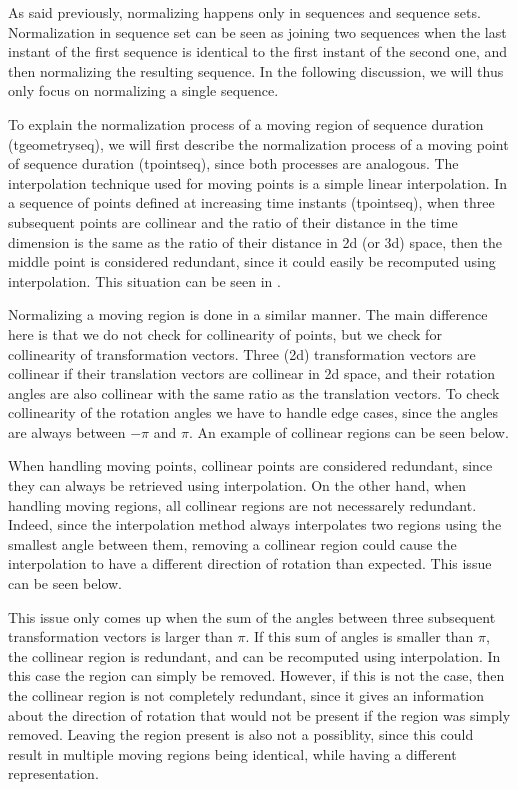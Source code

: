 	As said previously, normalizing happens only in sequences and sequence sets. Normalization in sequence set can be seen as joining two sequences when the last instant of the first sequence is identical to the first instant of the second one, and then normalizing the resulting sequence. In the following discussion, we will thus only focus on normalizing a single sequence.
	
	To explain the normalization process of a moving region of sequence duration (tgeometryseq), we will first describe the normalization process of a moving point of sequence duration (tpointseq), since both processes are analogous. The interpolation technique used for moving points is a simple linear interpolation. In a sequence of points defined at increasing time instants (tpointseq), when three subsequent points are collinear and the ratio of their distance in the time dimension is the same as the ratio of their distance in 2d (or 3d) space, then the middle point is considered redundant, since it could easily be recomputed using interpolation. This situation can be seen in .
	
	Normalizing a moving region is done in a similar manner. The main difference here is that we do not check for collinearity of points, but we check for collinearity of transformation vectors. Three (2d) transformation vectors are collinear if their translation vectors are collinear in 2d space, and their rotation angles are also collinear with the same ratio as the translation vectors. To check collinearity of the rotation angles we have to handle edge cases, since the angles are always between $-\pi$ and $\pi$. An example of collinear regions can be seen below.
	
	
	When handling moving points, collinear points are considered redundant, since they can always be retrieved using interpolation. On the other hand, when handling moving regions, all collinear regions are not necessarely redundant. Indeed, since the interpolation method always interpolates two regions using the smallest angle between them, removing a collinear region could cause the interpolation to have a different direction of rotation than expected. This issue can be seen below.
	
	
	This issue only comes up when the sum of the angles between three subsequent transformation vectors is larger than $\pi$. If this sum of angles is smaller than $\pi$, the collinear region is redundant, and can be recomputed using interpolation. In this case the region can simply be removed. However, if this is not the case, then the collinear region is not completely redundant, since it gives an information about the direction of rotation that would not be present if the region was simply removed. Leaving the region present is also not a possiblity, since this could result in multiple moving regions being identical, while having a different representation.
	
